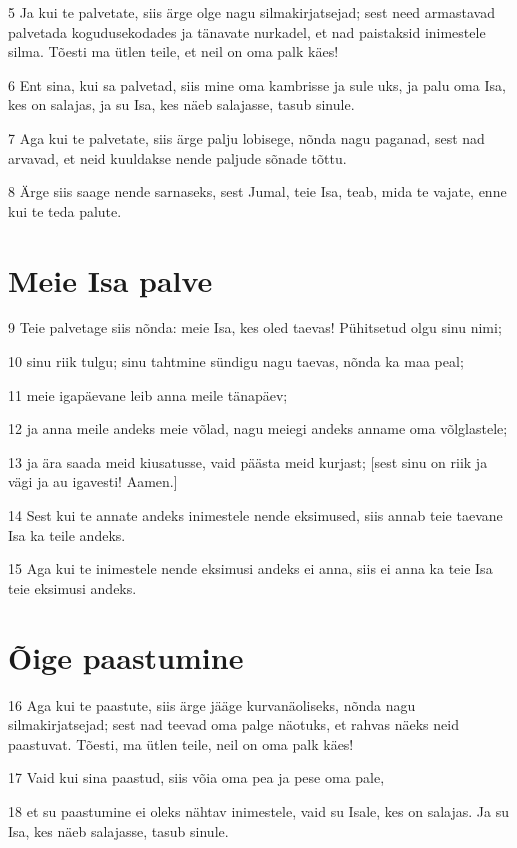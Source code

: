 \par 5 Ja kui te palvetate, siis ärge olge nagu silmakirjatsejad; sest need armastavad palvetada kogudusekodades ja tänavate nurkadel, et nad paistaksid inimestele silma. Tõesti ma ütlen teile, et neil on oma palk käes!
\par 6 Ent sina, kui sa palvetad, siis mine oma kambrisse ja sule uks, ja palu oma Isa, kes on salajas, ja su Isa, kes näeb salajasse, tasub sinule.
\par 7 Aga kui te palvetate, siis ärge palju lobisege, nõnda nagu paganad, sest nad arvavad, et neid kuuldakse nende paljude sõnade tõttu.
\par 8 Ärge siis saage nende sarnaseks, sest Jumal, teie Isa, teab, mida te vajate, enne kui te teda palute.

\section*{Meie Isa palve}

\par 9 Teie palvetage siis nõnda: meie Isa, kes oled taevas! Pühitsetud olgu sinu nimi;
\par 10 sinu riik tulgu; sinu tahtmine sündigu nagu taevas, nõnda ka maa peal;
\par 11 meie igapäevane leib anna meile tänapäev;
\par 12 ja anna meile andeks meie võlad, nagu meiegi andeks anname oma võlglastele;
\par 13 ja ära saada meid kiusatusse, vaid päästa meid kurjast; [sest sinu on riik ja vägi ja au igavesti! Aamen.]
\par 14 Sest kui te annate andeks inimestele nende eksimused, siis annab teie taevane Isa ka teile andeks.
\par 15 Aga kui te inimestele nende eksimusi andeks ei anna, siis ei anna ka teie Isa teie eksimusi andeks.

\section*{Õige paastumine}

\par 16 Aga kui te paastute, siis ärge jääge kurvanäoliseks, nõnda nagu silmakirjatsejad; sest nad teevad oma palge näotuks, et rahvas näeks neid paastuvat. Tõesti, ma ütlen teile, neil on oma palk käes!
\par 17 Vaid kui sina paastud, siis võia oma pea ja pese oma pale,
\par 18 et su paastumine ei oleks nähtav inimestele, vaid su Isale, kes on salajas. Ja su Isa, kes näeb salajasse, tasub sinule.

